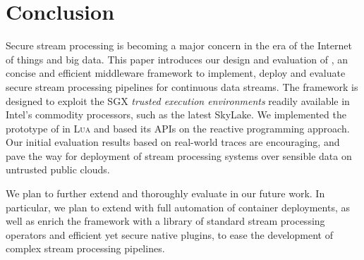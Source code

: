\section{Conclusion}
\label{sec:conclusion}

Secure stream processing is becoming a major concern in the era of the Internet of things and big data.
This paper introduces our design and evaluation of \SYS{}, an concise and efficient middleware framework to implement, deploy and evaluate secure stream processing pipelines for continuous data streams.
The framework is designed to exploit the SGX \emph{trusted execution environments} readily available in Intel's commodity processors, such as the latest SkyLake.
We implemented the prototype of \SYS{} in \textsc{Lua} and based its APIs on the reactive programming approach.
Our initial evaluation results based on real-world traces are encouraging, and pave the way for deployment of stream processing systems over sensible data on untrusted public clouds.

We plan to further extend and thoroughly evaluate \SYS in our future work.
In particular, we plan to extend \SYS with full automation of container deployments, as well as enrich the framework with a library of standard stream processing operators and efficient yet secure native plugins, to ease the development of complex stream processing pipelines.
